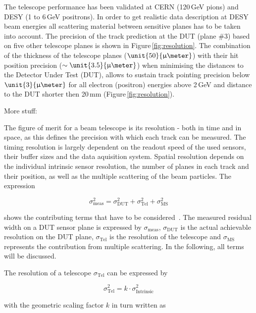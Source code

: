 
The telescope performance has been validated at CERN (120\,GeV pions) and DESY (1 to 6\,GeV positrons). 
In order to get realistic data description at DESY beam energies all scattering material between sensitive planes has to be taken into account. 
The precision of the track prediction at the DUT (plane \#3) based on five other telescope planes is shown in Figure\,\ref{fig:resolution}. 
The combination of the thickness of the telescope planes ($\unit{50}{\upmu\meter}$) with their hit position precision ($\sim\unit{3.5}{\upmu\meter}$)
 when minimising the distances to the Detector Under Test (DUT), 
 allows to sustain track pointing precision below $\unit{3}{\upmu\meter}$ for all electron (positron) energies above 2\,GeV and distance to the DUT shorter then 20\,mm (Figure\,\ref{fig:resolution}).

More stuff:


The figure of merit for a beam telescope is its resolution - both in time and in
space, as this defines the precision with which each track can be measured. 
The timing resolution is largely dependent on the readout speed of the used
sensors, their buffer sizes and the data aquisition system. 
Spatial resolution depends on the individual intrinsic sensor resolution, the number of planes in
each track and their position, as well as the multiple scattering of the beam particles. 
The expression

\begin{equation}
\label{eq:telescoperesolutionequation}
\sigma_{\textrm{meas}}^2 = \sigma_{\textrm{DUT}}^2 + \sigma_{\textrm{Tel}}^2 +
\sigma_{\textrm{MS}}^2
\end{equation}

shows the contributing terms that have to be
considered~\cite{ref:eudetreport200902}. 
The measured residual width on a DUT sensor plane is expressed by $\sigma_{\textrm{meas}}$,
$\sigma_{\textrm{DUT}}$ is the actual achievable resolution on the DUT plane,
$\sigma_{\textrm{Tel}}$ is the resolution of the telescope and
$\sigma_{\textrm{MS}}$ represents the contribution from multiple scattering.
In the following, all terms will be discussed.


The resolution of a telescope $\sigma_{\textrm{Tel}}$ can be expressed by

\begin{equation}
\sigma_{\textrm{Tel}}^2 = k \cdot \sigma_{\textrm{Intrinsic}}^2
\end{equation}

with the geometric scaling factor $k$ in turn written as

